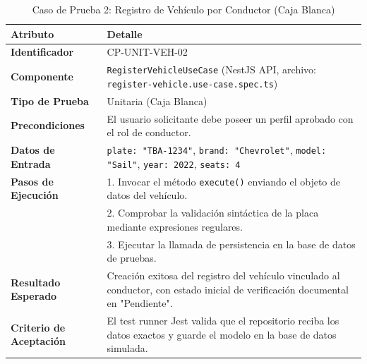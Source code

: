 \documentclass{article}
\begin{document}
\begin{table}[H]
\centering
\small
\caption{Caso de Prueba 2: Registro de Vehículo por Conductor (Caja Blanca)}
\begin{tabularx}{\linewidth}{p{4cm} X}
\toprule
\textbf{Atributo} & \textbf{Detalle} \\
\midrule
\textbf{Identificador} & CP-UNIT-VEH-02 \\
\textbf{Componente} & \texttt{RegisterVehicleUseCase} (NestJS API, archivo: \texttt{register-vehicle.use-case.spec.ts}) \\
\textbf{Tipo de Prueba} & Unitaria (Caja Blanca) \\
\textbf{Precondiciones} & El usuario solicitante debe poseer un perfil aprobado con el rol de conductor. \\
\textbf{Datos de Entrada} & \texttt{plate: "TBA-1234"}, \texttt{brand: "Chevrolet"}, \texttt{model: "Sail"}, \texttt{year: 2022}, \texttt{seats: 4} \\
\textbf{Pasos de Ejecución} & 1. Invocar el método \texttt{execute()} enviando el objeto de datos del vehículo.\\
& 2. Comprobar la validación sintáctica de la placa mediante expresiones regulares.\\
& 3. Ejecutar la llamada de persistencia en la base de datos de pruebas.\\
\textbf{Resultado Esperado} & Creación exitosa del registro del vehículo vinculado al conductor, con estado inicial de verificación documental en "Pendiente". \\
\textbf{Criterio de Aceptación} & El test runner Jest valida que el repositorio reciba los datos exactos y guarde el modelo en la base de datos simulada. \\
\bottomrule
\end{tabularx}
\end{table}
\end{document}
